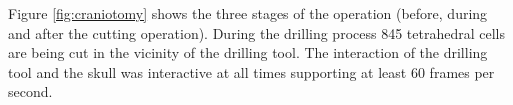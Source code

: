 Figure \ref{fig:craniotomy} shows the three stages of the operation (before, during and after the cutting operation). 
During the drilling process 845 tetrahedral cells are being cut in the vicinity of the drilling tool. The interaction of the drilling tool and the skull 
was interactive at all times supporting at least 60 frames per second.